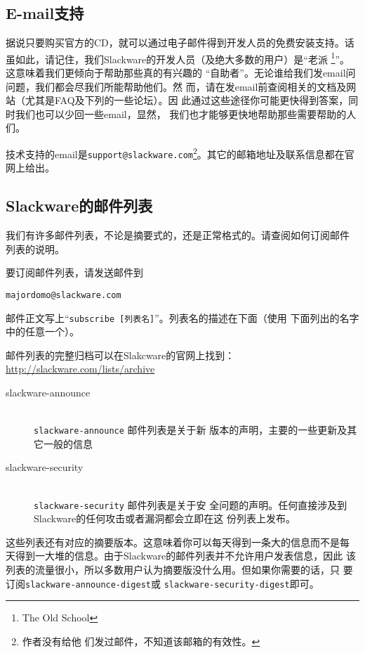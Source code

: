\subsection{E-mail支持}
\label{sec:help:onlineHelp:emailSupport}

据说只要购买官方的CD，就可以通过电子邮件得到开发人员的免费安装支持。话
虽如此，请记住，我们Slackware的开发人员（及绝大多数的用户）是``老派
\footnote{The Old School}''。这意味着我们更倾向于帮助那些真的有兴趣的
``自助者''。无论谁给我们发email问问题，我们都会尽我们所能帮助他们。然
而，请在发email前查阅相关的文档及网站（尤其是FAQ及下列的一些论坛）。因
此通过这些途径你可能更快得到答案，同时我们也可以少回一些email，显然，
我们也才能够更快地帮助那些需要帮助的人们。

技术支持的email是\texttt{support@slackware.com}\footnote{作者没有给他
  们发过邮件，不知道该邮箱的有效性。}。其它的邮箱地址及联系信息都在官
网上给出。

\subsection{Slackware的邮件列表}
\label{sec:help:onlineHelp:mailingLists}

我们有许多邮件列表，不论是摘要式的，还是正常格式的。请查阅如何订阅邮件
列表的说明。

要订阅邮件列表，请发送邮件到
\begin{verbatim}
majordomo@slackware.com
\end{verbatim}
邮件正文写上``\texttt{subscribe [列表名]}''。列表名的描述在下面（使用
下面列出的名字中的任意一个）。

邮件列表的完整归档可以在Slakcware的官网上找到：
\url{http://slackware.com/lists/archive}

\begin{description}
\item[slackware-announce] \hfill \\
 \texttt{slackware-announce} 邮件列表是关于新
  版本的声明，主要的一些更新及其它一般的信息
\item[slackware-security] \hfill \\
  \texttt{slackware-security} 邮件列表是关于安
  全问题的声明。任何直接涉及到Slackware的任何攻击或者漏洞都会立即在这
  份列表上发布。
\end{description}
这些列表还有对应的摘要版本。这意味着你可以每天得到一条大的信息而不是每
天得到一大堆的信息。由于Slackware的邮件列表并不允许用户发表信息，因此
该列表的流量很小，所以多数用户认为摘要版没什么用。但如果你需要的话，只
要订阅\texttt{slackware-announce-digest}或
\texttt{slackware-security-digest}即可。

